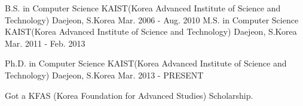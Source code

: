 

\begin{cventries}

  \cventry
    {B.S. in Computer Science} %
    {KAIST(Korea Advanced Institute of Science and Technology)} %
    {Daejeon, S.Korea} %
    {Mar. 2006 - Aug. 2010} %
    {M.S. in Computer Science} %
    {KAIST(Korea Advanced Institute of Science and Technology)} %
    {Daejeon, S.Korea} %
    {Mar. 2011 - Feb. 2013} %

    {Ph.D. in Computer Science} %
    {KAIST(Korea Advanced Institute of Science and Technology)} %
    {Daejeon, S.Korea} %
    {Mar. 2013 - PRESENT} %
    {
      \begin{cvitems} %
      \item {Got a KFAS (Korea Foundation for Advanced Studies) Scholarship.}
      \end{cvitems}
    }

\end{cventries}
